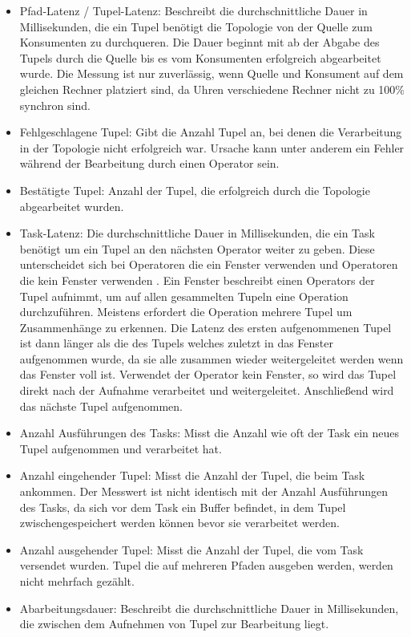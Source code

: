 \begin{itemize}
\item{Pfad-Latenz / Tupel-Latenz: Beschreibt die durchschnittliche Dauer in Millisekunden, die ein Tupel benötigt die Topologie von der Quelle zum Konsumenten zu durchqueren. 
Die Dauer beginnt mit ab der Abgabe des Tupels durch die Quelle bis es vom Konsumenten erfolgreich abgearbeitet wurde. 
Die Messung ist nur zuverlässig, wenn Quelle und Konsument auf dem gleichen Rechner platziert sind, da Uhren verschiedene Rechner nicht zu 100\% synchron sind.}
\item{Fehlgeschlagene Tupel: Gibt die Anzahl Tupel an,  bei denen die Verarbeitung in der Topologie nicht erfolgreich war.
Ursache kann unter anderem ein Fehler während der Bearbeitung durch einen Operator sein.}
\item{Bestätigte Tupel: Anzahl der Tupel, die erfolgreich durch die Topologie abgearbeitet wurden.}
\item{Task-Latenz: Die durchschnittliche Dauer in Millisekunden, die ein Task benötigt um ein Tupel an den nächsten Operator weiter zu geben. 
Diese unterscheidet sich bei Operatoren die ein Fenster verwenden und Operatoren die kein Fenster verwenden  \cite{lohrmann_elastic_2015}.
Ein Fenster beschreibt einen Operators der Tupel aufnimmt, um auf allen gesammelten Tupeln eine Operation durchzuführen.
Meistens erfordert die Operation mehrere Tupel um Zusammenhänge zu erkennen.
Die Latenz des ersten aufgenommenen Tupel ist dann länger als die des Tupels welches zuletzt in das Fenster aufgenommen wurde, da sie alle zusammen wieder weitergeleitet werden wenn das Fenster voll ist. 
Verwendet der Operator kein Fenster, so wird das Tupel direkt nach der Aufnahme verarbeitet und weitergeleitet.
Anschließend wird das nächste Tupel aufgenommen.}
\item{Anzahl Ausführungen des Tasks: Misst die Anzahl wie oft der Task ein neues Tupel aufgenommen und verarbeitet hat.}
\item{Anzahl eingehender Tupel: Misst die Anzahl der Tupel, die beim Task ankommen. Der Messwert ist nicht identisch mit der Anzahl Ausführungen des Tasks, da sich vor dem Task ein Buffer befindet, in dem Tupel zwischengespeichert werden können bevor sie verarbeitet werden.}
\item{Anzahl ausgehender Tupel: Misst die Anzahl der Tupel, die vom Task versendet wurden. Tupel die auf mehreren Pfaden ausgeben werden, werden nicht mehrfach gezählt.}
\item{Abarbeitungsdauer: Beschreibt die durchschnittliche Dauer in Millisekunden, die zwischen dem Aufnehmen von Tupel zur Bearbeitung liegt. 
}
\end{itemize}
